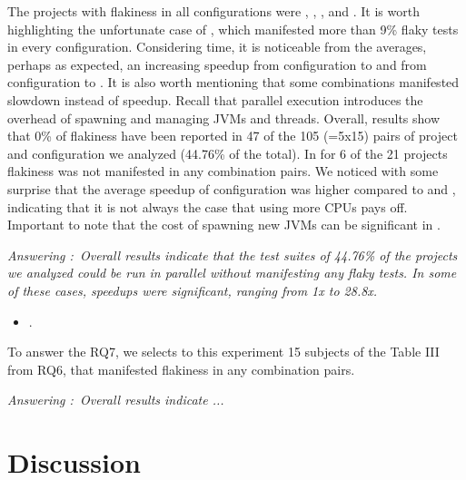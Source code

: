 \documentclass[10pt,journal,compsoc]{IEEEtran}
\begin{document}
The projects with flakiness
in all configurations were , , , and
.  It is worth highlighting the unfortunate case of
, which manifested more than 9\% flaky tests in
every configuration.  Considering time, it is noticeable from the
averages, perhaps as expected, an increasing speedup from
configuration \emph{\SeqClassParMeth} to \emph{\ParClassParMeth} and
from configuration \emph{\ForkSeq} to \emph{\ForkParMeth}.  It is also
worth mentioning that some combinations manifested slowdown instead of
speedup.  Recall that parallel execution introduces the overhead of
spawning and managing JVMs and threads.  Overall, results show that
0\% of flakiness have been reported in 47 of the 105 (=5x15)
pairs of project and configuration we analyzed (44.76\% of the total).
In for 6 of the 21 projects flakiness was not manifested in 
any combination pairs.  We noticed with some surprise that the average speedup of
configuration \emph{\SeqClassParMeth} was higher compared to \emph{\ParClassSeqMeth} and \emph{\ParClassParMeth},
indicating that it is not always the case that
using more CPUs pays off. Important to note that the cost of spawning
new JVMs can be significant in \emph{\ForkParMeth}.

\begin{mdframed}
\noindent\textit{Answering \numRQIssuesOne{}:~Overall results indicate that the
  test suites of 44.76\% of the projects we analyzed could be run in
  parallel without manifesting any flaky tests.  In some of these
  cases, speedups were significant, ranging from 1x to 28.8x.}
\end{mdframed}

\begin{itemize}
  \item \numRQIssuesTwo{}. \textbf{\RQIssuesTwo{}}
\end{itemize}



To answer the RQ7, we selects to this experiment 15 subjects of the Table III from RQ6, that manifested flakiness in any combination pairs. 

\begin{mdframed}
\noindent\textit{Answering \numRQIssuesTwo{}:~Overall results indicate ...}
\end{mdframed}



\section{Discussion}
\end{document}
